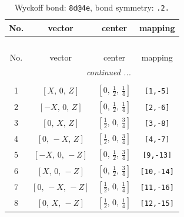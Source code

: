 \documentclass[fleqn,8pt]{jsarticle}
\begin{document}
\renewcommand{\arraystretch}{1.2}
\begin{longtable}{cccc}
\caption{Wyckoff bond: {\tt 8d@4e}, bond symmetry: {\tt .2.}}
 \\
 \hline \hline
No. & vector & center & mapping \\ \hline \endfirsthead

\multicolumn{3}{l}{\tablename\ \thetable{}} \\
 \hline \hline
No. & vector & center & mapping \\ \hline \endhead

 \hline \hline
\multicolumn{3}{r}{\footnotesize\it continued ...} \\ \endfoot

 \hline \hline
\multicolumn{3}{r}{} \\ \endlastfoot

1 & $\left[ X,\, 0,\, Z \right]$ & $\left[ 0,\, \frac{1}{2},\, \frac{1}{4} \right]$ & {\tt [1,-5]} \\ \hline
2 & $\left[ - X,\, 0,\, Z \right]$ & $\left[ 0,\, \frac{1}{2},\, \frac{1}{4} \right]$ & {\tt [2,-6]} \\ \hline
3 & $\left[ 0,\, X,\, Z \right]$ & $\left[ \frac{1}{2},\, 0,\, \frac{3}{4} \right]$ & {\tt [3,-8]} \\ \hline
4 & $\left[ 0,\, - X,\, Z \right]$ & $\left[ \frac{1}{2},\, 0,\, \frac{3}{4} \right]$ & {\tt [4,-7]} \\ \hline
5 & $\left[ - X,\, 0,\, - Z \right]$ & $\left[ 0,\, \frac{1}{2},\, \frac{3}{4} \right]$ & {\tt [9,-13]} \\ \hline
6 & $\left[ X,\, 0,\, - Z \right]$ & $\left[ 0,\, \frac{1}{2},\, \frac{3}{4} \right]$ & {\tt [10,-14]} \\ \hline
7 & $\left[ 0,\, - X,\, - Z \right]$ & $\left[ \frac{1}{2},\, 0,\, \frac{1}{4} \right]$ & {\tt [11,-16]} \\ \hline
8 & $\left[ 0,\, X,\, - Z \right]$ & $\left[ \frac{1}{2},\, 0,\, \frac{1}{4} \right]$ & {\tt [12,-15]} \\
\end{longtable}
\renewcommand{\arraystretch}{1.2}
\end{document}
